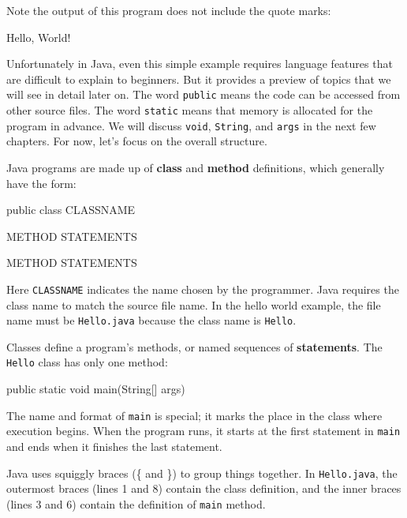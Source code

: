 \documentclass[12pt]{book}
\theoremstyle{exercise}
\newcommand{\java}[1]{\verb"#1"}
\newcommand{\java}[1]{\lstinline{#1}} %
\begin{document}
Note the output of this program does not include the quote marks:

\begin{stdout}
Hello, World!
\end{stdout}


Unfortunately in Java, even this simple example requires language features that are difficult to explain to beginners.
But it provides a preview of topics that we will see in detail later on.
The word \java{public} means the code can be accessed from other source files.
The word \java{static} means that memory is allocated for the program in advance.
We will discuss \java{void}, \java{String}, and \java{args} in the next few chapters.
For now, let's focus on the overall structure.


Java programs are made up of {\bf class} and {\bf method} definitions, which generally have the form:

\begin{code}
public class CLASSNAME {

    METHOD {
        STATEMENTS
    }

    METHOD {
        STATEMENTS
    }

}
\end{code}


Here \java{CLASSNAME} indicates the name chosen by the programmer.
Java requires the class name to match the source file name.
In the hello world example, the file name must be {\tt Hello.java} because the class name is \java{Hello}.


Classes define a program's methods, or named sequences of {\bf statements}.
The \java{Hello} class has only one method:

\begin{code}
    public static void main(String[] args)
\end{code}

The name and format of \java{main} is special; it marks the place in the class where execution begins.
When the program runs, it starts at the first statement in \java{main} and ends when it finishes the last statement.


Java uses squiggly braces (\{ and \}) to group things together.
In {\tt Hello.java}, the outermost braces (lines 1 and 8) contain the class definition, and the inner braces (lines 3 and 6) contain the definition of \java{main} method.
\end{document}
